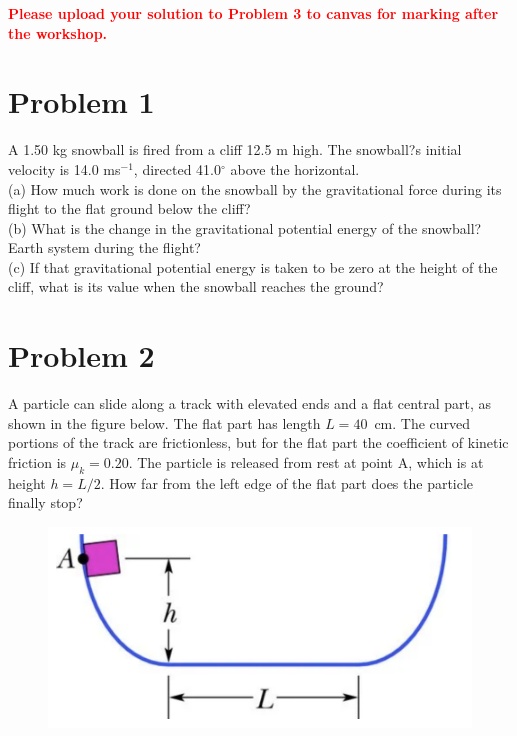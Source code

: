 \documentclass[11pt]{article}
\begin{document}
\noindent
\textbf{\textcolor{red}{Please upload your solution to Problem 3 to canvas for marking after the workshop.}}\\

\section*{Problem 1}

A 1.50 kg snowball is fired from a cliff 12.5 m high. The snowball?s initial velocity is 14.0 ms$^{-1}$, directed 41.0$^{\circ}$ above the horizontal. \\
(a) How much work is done on the snowball by the gravitational force during its flight to the flat ground below the cliff?\\
(b) What is the change in the gravitational potential energy of the snowball?Earth system during the flight? \\
(c) If that gravitational potential energy is taken to be zero at the height of the cliff, what is its value when the snowball reaches the ground?\\


\noindent

\section*{Problem 2}
A particle can slide along a track with elevated ends and a flat central part, as shown in the figure below. The flat part has length $L = 40$~cm. The curved portions of the track are frictionless, but for the flat part the coefficient of kinetic friction is $\mu_k = 0.20$. The particle is released from rest at point A, which is at height $h = L/2$. How far from the left edge of the flat part does the particle finally stop?

\begin{figure}[h]
\includegraphics[scale=0.5]{2021-W6-Q2}

\end{figure}
\end{document}
